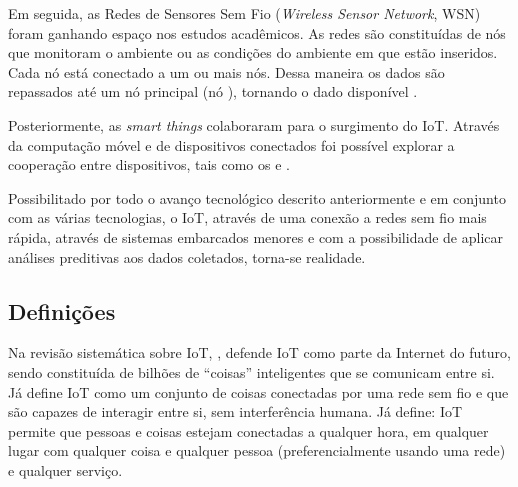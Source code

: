 
Em seguida, as Redes de Sensores Sem Fio (\textit{Wireless Sensor Network}, WSN)
foram ganhando espaço nos estudos acadêmicos. As redes são constituídas de nós
que monitoram o ambiente ou as condições do ambiente em que estão inseridos.
Cada nó está conectado a um ou mais nós. Dessa maneira os dados são repassados
até um nó principal (nó \gateway), tornando o dado disponível
\cite{lewis2004wireless}.

Posteriormente, as \textit{smart things} colaboraram para o surgimento do IoT.
Através da computação móvel e de dispositivos conectados foi possível explorar
a cooperação entre dispositivos, tais como os \smartphones[] e \smartwatches.

Possibilitado por todo o avanço tecnológico descrito anteriormente e em
conjunto com as várias tecnologias, o IoT, através de uma conexão a redes sem
fio mais rápida, através de sistemas embarcados menores e com a possibilidade
de aplicar análises preditivas aos dados coletados, torna-se realidade.


\subsection{Definições} \label{subsec:iot-definicoes}

Na revisão sistemática sobre IoT, , defende IoT como
parte da Internet do futuro, sendo constituída de bilhões de ``coisas''
inteligentes que se comunicam entre si. Já  define
IoT como um conjunto de coisas conectadas por uma rede sem fio e que são
capazes de interagir entre si, sem interferência humana. Já
 define: IoT permite que pessoas e coisas
estejam conectadas a qualquer hora, em qualquer lugar com qualquer coisa e
qualquer pessoa (preferencialmente usando uma rede) e qualquer serviço.

